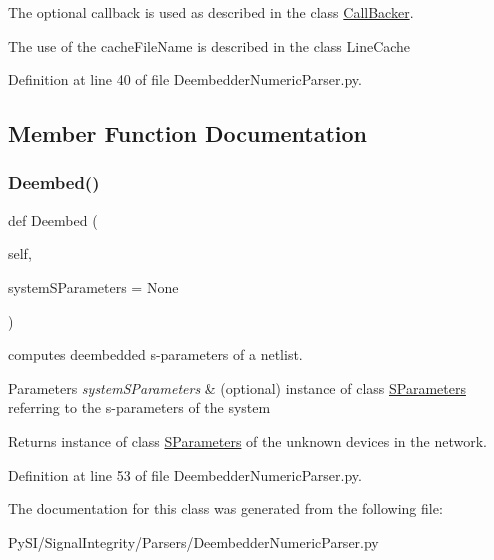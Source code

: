 The optional callback is used as described in the class \hyperlink{namespaceSignalIntegrity_1_1CallBacker}{Call\+Backer}.

The use of the cache\+File\+Name is described in the class Line\+Cache 

Definition at line 40 of file Deembedder\+Numeric\+Parser.\+py.



\subsection{Member Function Documentation}
\mbox{\label{classSignalIntegrity_1_1Parsers_1_1DeembedderNumericParser_1_1DeembedderNumericParser_aa04b7e5ad8ffcfb9ef4f6f1fd03594b3}} 
\subsubsection{\texorpdfstring{Deembed()}{Deembed()}}
{\footnotesize\ttfamily def Deembed (\begin{DoxyParamCaption}\item[{}]{self,  }\item[{}]{system\+S\+Parameters = {\ttfamily None} }\end{DoxyParamCaption})}



computes deembedded s-\/parameters of a netlist. 


\begin{DoxyParams}{Parameters}
{\em system\+S\+Parameters} & (optional) instance of class \hyperlink{namespaceSignalIntegrity_1_1SParameters}{S\+Parameters} referring to the s-\/parameters of the system \\
\hline
\end{DoxyParams}
\begin{DoxyReturn}{Returns}
instance of class \hyperlink{namespaceSignalIntegrity_1_1SParameters}{S\+Parameters} of the unknown devices in the network. 
\end{DoxyReturn}


Definition at line 53 of file Deembedder\+Numeric\+Parser.\+py.



The documentation for this class was generated from the following file\+:\begin{DoxyCompactItemize}
\item 
Py\+S\+I/\+Signal\+Integrity/\+Parsers/Deembedder\+Numeric\+Parser.\+py\end{DoxyCompactItemize}
